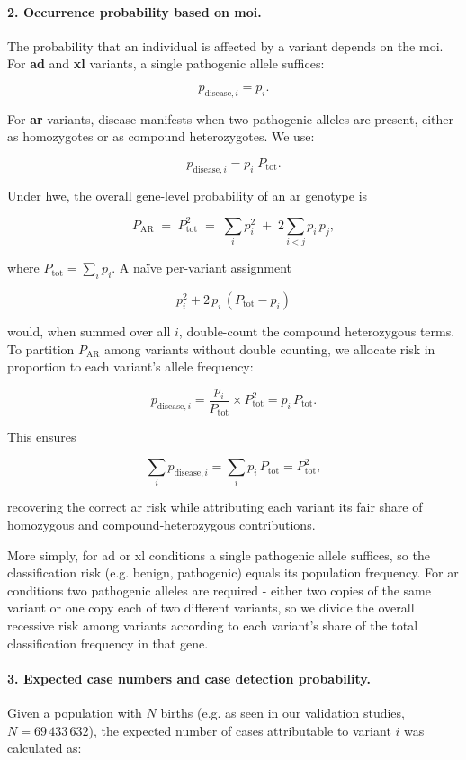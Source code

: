 \paragraph{2. Occurrence probability based on \ac{moi}.}
The probability that an individual is affected by a variant depends on the \ac{moi}. For \textbf{\ac{ad}} and \textbf{\ac{xl}} variants, a single pathogenic allele suffices:

\[
p_{\text{disease},i} = p_i.
\]

For\textbf{ \ac{ar}} variants, disease manifests when two pathogenic alleles are present, either as homozygotes or as compound heterozygotes. We use:

\[p_{\text{disease},i} = p_i \; P_{\text{tot}}.\] %

Under \ac{hwe}, the overall gene-level probability of an \ac{ar} genotype is

\[
P_{\text{AR}} \;=\; P_{\text{tot}}^2
\;=\;\sum_i p_i^2 \;+\; 2\sum_{i<j} p_i\,p_j,
\]

where \(P_{\text{tot}}=\sum_i p_i\). A naïve per-variant assignment

\[
p_i^2 + 2\,p_i\,(P_{\text{tot}} - p_i)
\]

would, when summed over all \(i\), double-count the compound heterozygous terms. 
To partition \(P_{\text{AR}}\) among variants without double counting, we allocate risk in proportion to each variant’s allele frequency:

\[
p_{\text{disease},i}
=\frac{p_i}{P_{\text{tot}}}\times P_{\text{tot}}^2
= p_i\,P_{\text{tot}}.
\]

This ensures

\[
\sum_i p_{\text{disease},i}
= \sum_i p_i\,P_{\text{tot}}
= P_{\text{tot}}^2,
\]

recovering the correct \ac{ar} risk while attributing each variant its fair share of homozygous and compound-heterozygous contributions.

More simply, for \ac{ad} or \ac{xl} conditions a single pathogenic allele suffices, so the classification risk (e.g. benign, pathogenic) equals its population frequency. For \ac{ar} conditions two pathogenic alleles are required - either two copies of the same variant or one copy each of two different variants, so we divide the overall recessive risk among variants according to each variant’s share of the total classification frequency in that gene.

\paragraph{3. Expected case numbers and case detection probability.}
Given a population with \(N\) births (e.g. as seen in our validation studies, \(N = 69\,433\,632\)), the expected number of cases attributable to variant \(i\) was calculated as:

